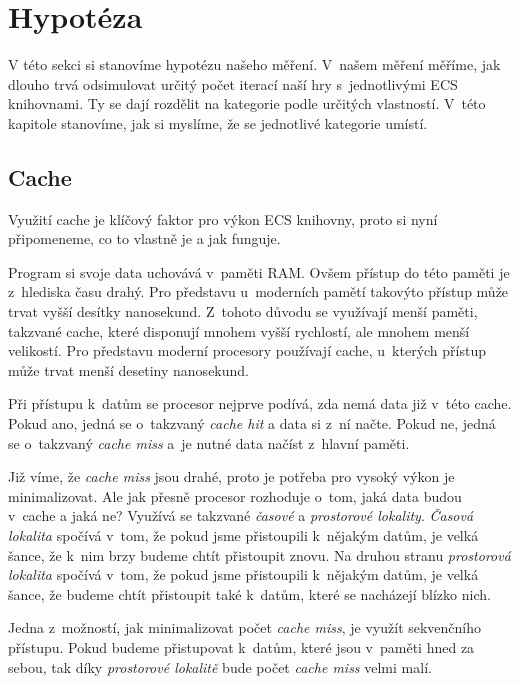 \section{Hypotéza}
\label{chap:hypothesis}
V této sekci si stanovíme hypotézu našeho měření. V~našem měření měříme, jak dlouho trvá odsimulovat určitý počet iterací naší hry s~jednotlivými ECS knihovnami. Ty se dají rozdělit na kategorie podle určitých vlastností. V~této kapitole stanovíme, jak si myslíme, že se jednotlivé kategorie umístí.


\subsection{Cache}
Využití cache je klíčový faktor pro výkon ECS knihovny, proto si nyní připomeneme, co to vlastně je a jak funguje.

Program si svoje data uchovává v~paměti RAM. Ovšem přístup do této paměti je z~hlediska času drahý. Pro představu u~moderních pamětí takovýto přístup může trvat vyšší desítky nanosekund. Z~tohoto důvodu se využívají menší paměti, takzvané cache, které disponují mnohem vyšší rychlostí, ale mnohem menší velikostí. Pro představu moderní procesory používají cache, u~kterých přístup může trvat menší desetiny nanosekund.

Při přístupu k~datům se procesor nejprve podívá, zda nemá data již v~této cache. Pokud ano, jedná se o~takzvaný \textit{cache hit} a data si z~ní načte. Pokud ne, jedná se o~takzvaný \textit{cache miss} a~je nutné data načíst z~hlavní paměti. 

Již víme, že \textit{cache miss} jsou drahé, proto je potřeba pro vysoký výkon je minimalizovat. Ale jak přesně procesor rozhoduje o~tom, jaká data budou v~cache a jaká ne? Využívá se takzvané \textit{časové} a \textit{prostorové lokality}. \textit{Časová lokalita} spočívá v~tom, že pokud jsme přistoupili k~nějakým datům, je velká šance, že k~nim brzy budeme chtít přistoupit znovu. Na druhou stranu \textit{prostorová lokalita} spočívá v~tom, že pokud jsme přistoupili k~nějakým datům, je velká šance, že budeme chtít přistoupit také k~datům, které se nacházejí blízko nich.

Jedna z~možností, jak minimalizovat počet \textit{cache miss}, je využít sekvenčního přístupu. Pokud budeme přistupovat k~datům, které jsou v~paměti hned za sebou, tak díky \textit{prostorové lokalitě} bude počet \textit{cache miss} velmi malí.

